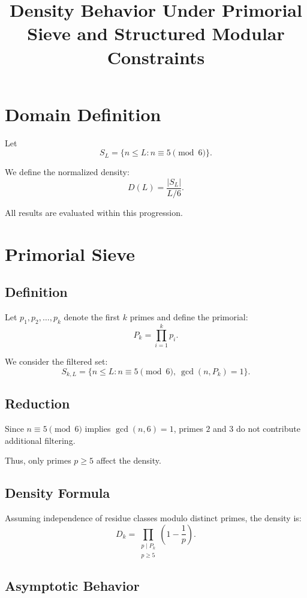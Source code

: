 \documentclass[11pt]{article}
\title{Density Behavior Under Primorial Sieve and Structured Modular Constraints}
\author{}
\date{}
\begin{document}
\maketitle

\section{Domain Definition}

Let
\[
S_L = \{ n \leq L : n \equiv 5 \pmod{6} \}.
\]

We define the normalized density:
\[
D(L) = \frac{|S_L|}{L/6}.
\]

All results are evaluated within this progression.

\section{Primorial Sieve}

\subsection{Definition}

Let $p_1, p_2, \dots, p_k$ denote the first $k$ primes and define the primorial:
\[
P_k = \prod_{i=1}^k p_i.
\]

We consider the filtered set:
\[
S_{k,L} = \{ n \leq L : n \equiv 5 \pmod{6}, \ \gcd(n, P_k) = 1 \}.
\]

\subsection{Reduction}

Since $n \equiv 5 \pmod{6}$ implies $\gcd(n,6)=1$, primes $2$ and $3$ do not contribute additional filtering.

Thus, only primes $p \geq 5$ affect the density.

\subsection{Density Formula}

Assuming independence of residue classes modulo distinct primes, the density is:
\[
D_k = \prod_{\substack{p \mid P_k \\ p \geq 5}} \left(1 - \frac{1}{p}\right).
\]

\subsection{Asymptotic Behavior}
\end{document}
